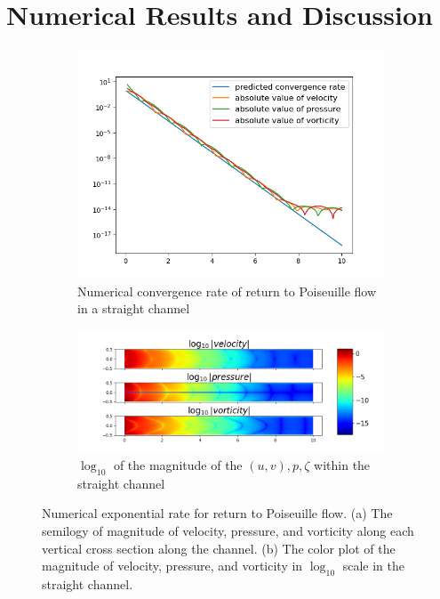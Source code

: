 \documentclass[10pt,twocolumn,letterpaper]{article}
\begin{document}
\section{Numerical Results and Discussion\label{sec:numericalresults}}
\begin{figure}[!ht]
  \centering
  \begin{subfigure}[b]{0.4\textwidth}
    \centering
    \includegraphics[width=\textwidth]{pic/rtp_cv.png}
    \caption{Numerical convergence rate of return to Poiseuille flow in a straight channel}\label{fig:rtp_cv}
  \end{subfigure}
  \begin{subfigure}[b]{0.4\textwidth}
    \centering
    \includegraphics[width=\textwidth]{pic/rtppipe.png}
    \caption{$\log_{10}$ of the magnitude of the $(u,v),p,\zeta$ within the straight channel}\label{fig:rtppipe}
  \end{subfigure}
  \caption{Numerical exponential rate for return to Poiseuille flow.
    (a) The semilogy of magnitude of velocity, pressure, and vorticity
    along each vertical cross section along the channel.
    (b) The color plot of the magnitude of velocity, pressure, and vorticity in $\log_{10}$ scale in the straight channel.
  }\label{fig:r2pnumerical}
\end{figure}
\end{document}
